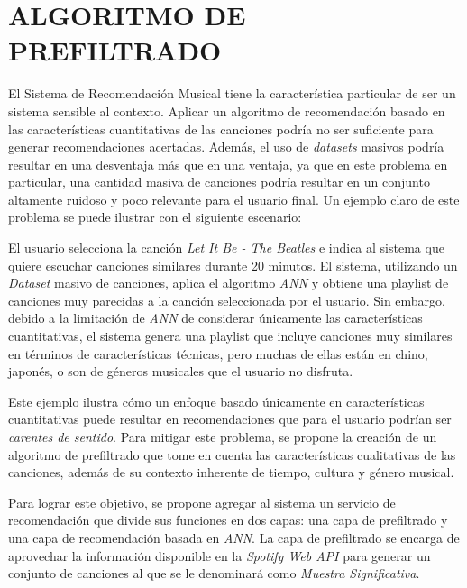 \section{ALGORITMO DE PREFILTRADO}

El Sistema de Recomendación Musical tiene la característica particular de ser un sistema sensible al contexto. Aplicar un algoritmo de recomendación basado en las características cuantitativas de las canciones podría no ser suficiente para generar recomendaciones acertadas. Además, el uso de \textit{datasets} masivos podría resultar en una desventaja más que en una ventaja, ya que en este problema en particular, una cantidad masiva de canciones podría resultar en un conjunto altamente ruidoso y poco relevante para el usuario final. Un ejemplo claro de este problema se puede ilustrar con el siguiente escenario:

\begin{example}
    El usuario selecciona la canción \textit{Let It Be - The Beatles} e indica al sistema que quiere escuchar canciones similares durante 20 minutos. 
    El sistema, utilizando un \textit{Dataset} masivo de canciones, aplica el algoritmo \textit{ANN} y obtiene una playlist de canciones muy parecidas a la canción seleccionada por el usuario.
    Sin embargo, debido a la limitación de \textit{ANN} de considerar únicamente las características cuantitativas, el sistema genera una playlist que incluye canciones muy similares en términos de características técnicas, pero muchas de ellas están en chino, japonés, o son de géneros musicales que el usuario no disfruta.
\end{example}

Este ejemplo ilustra cómo un enfoque basado únicamente en características cuantitativas puede resultar en recomendaciones que para el usuario podrían ser \textit{carentes de sentido}. Para mitigar este problema, se propone la creación de un algoritmo de prefiltrado que tome en cuenta las características cualitativas de las canciones, además de su contexto inherente de tiempo, cultura y género musical.

Para lograr este objetivo, se propone agregar al sistema un servicio de recomendación que divide sus funciones en dos capas: una capa de prefiltrado y una capa de recomendación basada en \textit{ANN}. La capa de prefiltrado se encarga de aprovechar la información disponible en la \textit{Spotify Web API} para generar un conjunto de canciones al que se le denominará como \textit{Muestra Significativa}.


